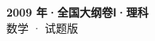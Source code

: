 \documentclass[zihao=-4, a4paper]{ctexart}
\begin{document}
\begin{center}
  {\Large\bfseries 2009 年·全国大纲卷Ⅰ·理科}\\[4pt]
  {\large 数学 · 试题版}
\end{center}
\medskip
{}

\end{document}
